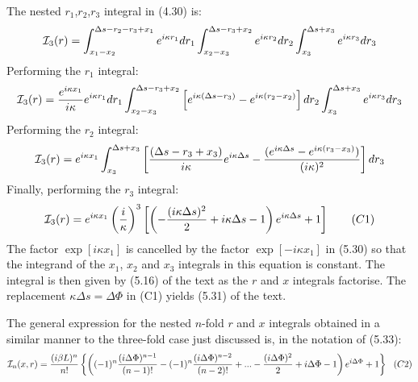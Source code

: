 {  The nested $r_1$,$r_2$,$r_3$ integral in (4.30) is:
  \[ {\cal I}_{3}(r)= \int_{x_1-x_2}^{\Delta s-r_2-r_3+x_1} e^{i\kappa r_1}  d r_1
   \int_{x_2-x_3}^{\Delta s-r_3+x_2} e^{i\kappa r_2}  d r_2
   \int_{x_3}^{\Delta s+x_3} e^{i\kappa r_3}  d r_3 \]
    Performing the $r_1$ integral:
   \[ {\cal I}_{3}(r)= \frac{e^{i\kappa x_1}}{i\kappa} e^{i\kappa r_1}  d r_1
   \int_{x_2-x_3}^{\Delta s-r_3+x_2}\left[ e^{i\kappa(\Delta s-r_3)}
     -   e^{i\kappa(r_2- x_2)}\right] d r_2
   \int_{x_3}^{\Delta s+x_3} e^{i\kappa r_3}  d r_3 \]
    Performing the $r_2$ integral:
      \[ {\cal I}_{3}(r)= e^{i\kappa x_1}\int_{x_3}^{\Delta s+x_3}\left[
       \frac{(\Delta s-r_3+x_3)}{i\kappa} e^{i\kappa \Delta s}
      -\frac{(e^{i\kappa \Delta s}-e^{i\kappa(r_3-x_3)})}{(i\kappa)^2} \right] d r_3 \]
    Finally, performing the $r_3$ integral:
      \[ {\cal I}_{3}(r) =  e^{i\kappa x_1} \left(\frac{i}{\kappa}\right)^3
      \left[\left(-\frac{(i\kappa \Delta s)^2}{2}+i\kappa \Delta s -1\right)e^{i\kappa \Delta s}
        +1 \right]~~~~~~(C1) \]
      The factor $\exp[i\kappa x_1]$ is cancelled by the factor  $\exp[-i\kappa x_1]$ in (5.30)
      so that the integrand of the $x_1$, $x_2$ and $x_3$ integrals in this equation is constant.
      The integral is then given by (5.16) of the text as the $r$ and $x$ integrals
      factorise. The replacement $\kappa \Delta s = \Delta \Phi$ in (C1) yields (5.31) of the
      text. 
      \par The general expression for the nested $n$-fold $r$ and $x$ integrals
       obtained in a similar manner to the three-fold case just discussed is, in the 
      notation of (5.33):
      \[ {\cal I}_{n}(x,r) =  \frac{(i\beta L)^n}{n!}
       \left\{\left((-1)^n \frac{(i \Delta \Phi)^{n-1}}{(n-1)!}
       - (-1)^n \frac{(i \Delta \Phi)^{n-2}}{(n-2)!}+...
       -\frac{(i \Delta \Phi)^2}{2}+i \Delta \Phi -1\right) e^{i \Delta \Phi}+1 \right\}~~(C2)\] 

}
